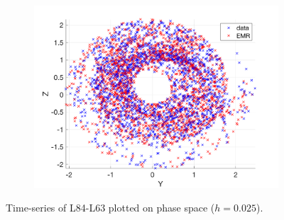 \documentclass[12pt]{article}
\begin{document}
\begin{figure}[H]
\begin{subfigure}[b]{0.3\textwidth}
		\includegraphics[width=\textwidth]{plots/l84l63/traj3l840025.png}
	\end{subfigure}
	\caption{Time-series of L84-L63 plotted on phase space ($h=0.025$).}
\end{figure}
\end{document}
